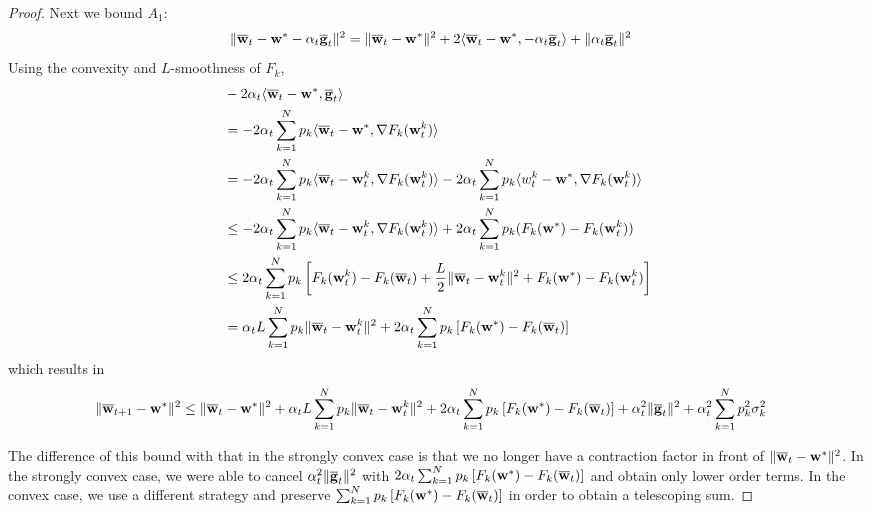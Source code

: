 \begin{proof}
	Next we bound $A_{1}$: 
	\begin{align*}
	\|{\overline{\mathbf{w}}}_{t}-{\mathbf{w}}^{\ast}-\alpha_{t}{\overline{\mathbf{g}}}_{t}\|^{2} & =\|{\overline{\mathbf{w}}}_{t}-{\mathbf{w}}^{\ast}\|^{2}+2\langle{\overline{\mathbf{w}}}_{t}-{\mathbf{w}}^{\ast},-\alpha_{t}{\overline{\mathbf{g}}}_{t}\rangle+\|\alpha_{t}{\overline{\mathbf{g}}}_{t}\|^{2}
	\end{align*}
	Using the convexity and $L$-smoothness of $F_{k}$, 
	\begin{align*}
	& -2\alpha_{t}\langle{\overline{\mathbf{w}}}_{t}-{\mathbf{w}}^{\ast},{\overline{\mathbf{g}}}_{t}\rangle\\
	& =-2\alpha_{t}\sum_{k=1}^{N}p_{k}\langle{\overline{\mathbf{w}}}_{t}-{\mathbf{w}}^{\ast},\nabla F_{k}({\mathbf{w}}_{t}^{k})\rangle\\
	& =-2\alpha_{t}\sum_{k=1}^{N}p_{k}\langle{\overline{\mathbf{w}}}_{t}-{\mathbf{w}}_{t}^{k},\nabla F_{k}({\mathbf{w}}_{t}^{k})\rangle-2\alpha_{t}\sum_{k=1}^{N}p_{k}\langle w_{t}^{k}-{\mathbf{w}}^{\ast},\nabla F_{k}({\mathbf{w}}_{t}^{k})\rangle\\
	& \leq-2\alpha_{t}\sum_{k=1}^{N}p_{k}\langle{\overline{\mathbf{w}}}_{t}-{\mathbf{w}}_{t}^{k},\nabla F_{k}({\mathbf{w}}_{t}^{k})\rangle+2\alpha_{t}\sum_{k=1}^{N}p_{k}(F_{k}({\mathbf{w}}^{\ast})-F_{k}({\mathbf{w}}_{t}^{k}))\\
	& \leq2\alpha_{t}\sum_{k=1}^{N}p_{k}\left[F_{k}({\mathbf{w}}_{t}^{k})-F_{k}({\overline{\mathbf{w}}}_{t})+\frac{L}{2}\|{\overline{\mathbf{w}}}_{t}-{\mathbf{w}}_{t}^{k}\|^{2}+F_{k}({\mathbf{w}}^{\ast})-F_{k}({\mathbf{w}}_{t}^{k})\right]\\
	& =\alpha_{t}L\sum_{k=1}^{N}p_{k}\|{\overline{\mathbf{w}}}_{t}-{\mathbf{w}}_{t}^{k}\|^{2}+2\alpha_{t}\sum_{k=1}^{N}p_{k}\left[F_{k}({\mathbf{w}}^{\ast})-F_{k}({\overline{\mathbf{w}}}_{t})\right]
	\end{align*}
	which results in 
	\begin{align*}
	\|{\overline{\mathbf{w}}}_{t+1}-{\mathbf{w}}^{\ast}\|^{2} & \leq\|{\overline{\mathbf{w}}}_{t}-{\mathbf{w}}^{\ast}\|^{2}+\alpha_{t}L\sum_{k=1}^{N}p_{k}\|{\overline{\mathbf{w}}}_{t}-{\mathbf{w}}_{t}^{k}\|^{2}+2\alpha_{t}\sum_{k=1}^{N}p_{k}\left[F_{k}({\mathbf{w}}^{\ast})-F_{k}({\overline{\mathbf{w}}}_{t})\right]+\alpha_{t}^{2}\|{\overline{\mathbf{g}}}_{t}\|^{2}+\alpha_{t}^{2}\sum_{k=1}^{N}p_{k}^{2}\sigma_{k}^{2}
	\end{align*}
	
	The difference of this bound with that in the strongly convex case
	is that we no longer have a contraction factor in front of $\|{\overline{\mathbf{w}}}_{t}-{\mathbf{w}}^{\ast}\|^{2}$.
	In the strongly convex case, we were able to cancel $\alpha_{t}^{2}\|{\overline{\mathbf{g}}}_{t}\|^{2}$
	with $2\alpha_{t}\sum_{k=1}^{N}p_{k}\left[F_{k}({\mathbf{w}}^{\ast})-F_{k}({\overline{\mathbf{w}}}_{t})\right]$
	and obtain only lower order terms. In the convex case, we use a different
	strategy and preserve $\sum_{k=1}^{N}p_{k}\left[F_{k}({\mathbf{w}}^{\ast})-F_{k}({\overline{\mathbf{w}}}_{t})\right]$
	in order to obtain a telescoping sum. 
	

\end{proof}
